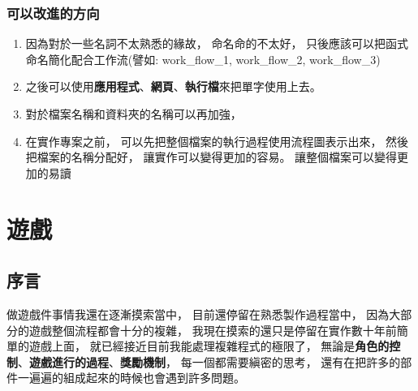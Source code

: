 \documentclass[12pt,oneside]{ctexart}
\begin{document}
\subsubsection{ 可以改進的方向}
\begin{enumerate}
    \item 
        因為對於一些名詞不太熟悉的緣故，
        命名命的不太好，
        只後應該可以把函式命名簡化配合工作流(譬如: work\_flow\_1, work\_flow\_2, work\_flow\_3)
    \item
        之後可以使用\textbf{應用程式}、\textbf{網頁}、\textbf{執行檔}來把單字使用上去。
    \item
        對於檔案名稱和資料夾的名稱可以再加強，
    \item 
        在實作專案之前，
        可以先把整個檔案的執行過程使用流程圖表示出來，
        然後把檔案的名稱分配好，
        讓實作可以變得更加的容易。
        讓整個檔案可以變得更加的易讀
\end{enumerate}


\clearpage
\section{ 遊戲}
\label{sec::game}

\subsection{序言}

做遊戲件事情我還在逐漸摸索當中，
目前還停留在熟悉製作過程當中，
因為大部分的遊戲整個流程都會十分的複雜，
我現在摸索的還只是停留在實作數十年前簡單的遊戲上面，
就已經接近目前我能處理複雜程式的極限了，
無論是\textbf{角色的控制}、\textbf{遊戲進行的過程}、\textbf{獎勵機制}，
每一個都需要縝密的思考，
還有在把許多的部件一遍遍的組成起來的時候也會遇到許多問題。
\end{document}
